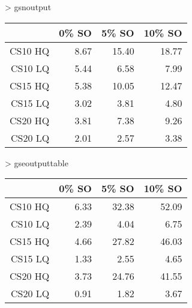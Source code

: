 > gsnoutput
\begin{table}[ht]
\begin{center}
\begin{tabular}{rrrr}
  \hline
 & 0\% SO & 5\% SO & 10\% SO \\
  \hline
CS10 HQ & 8.67 & 15.40 & 18.77 \\
  CS10 LQ & 5.44 & 6.58 & 7.99 \\
  CS15 HQ & 5.38 & 10.05 & 12.47 \\
  CS15 LQ & 3.02 & 3.81 & 4.80 \\
  CS20 HQ & 3.81 & 7.38 & 9.26 \\
  CS20 LQ & 2.01 & 2.57 & 3.38 \\
   \hline
\end{tabular}
\end{center}
\end{table}
> gseoutputtable
\begin{table}[ht]
\begin{center}
\begin{tabular}{rrrr}
  \hline
 & 0\% SO & 5\% SO & 10\% SO \\
  \hline
CS10 HQ & 6.33 & 32.38 & 52.09 \\
  CS10 LQ & 2.39 & 4.04 & 6.75 \\
  CS15 HQ & 4.66 & 27.82 & 46.03 \\
  CS15 LQ & 1.33 & 2.55 & 4.65 \\
  CS20 HQ & 3.73 & 24.76 & 41.55 \\
  CS20 LQ & 0.91 & 1.82 & 3.67 \\
   \hline
\end{tabular}
\end{center}
\end{table}

